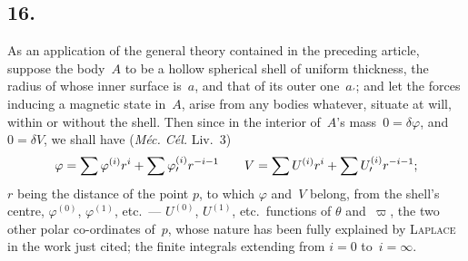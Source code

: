 \documentclass[11pt,notitlepage]{amsart}
\let\Person\textsc
\let\Title\textit
\newcommand\Section[1]{\subsection{{#1}}}
\renewcommand{\phi}{\varphi}
\begin{document}
\Section{16.}
As an application of the general theory contained in the preceding
article, suppose the body~$A$
to be a hollow spherical shell of uniform thickness,
the radius of whose inner surface is~$a$,
and that of its outer one~$a_\prime$; and let
the forces inducing a magnetic state in~$A$, arise from any bodies whatever,
situate at will, within or without the shell. Then since in the interior 
of~$A$'s
mass~${0=\delta\phi}$, and~${0=\delta V}$,
we shall have (\Title{M\'ec. C\'el.} Liv.~3)
\[
\phi=\sum\phi^{(i)}r^i+\sum\phi^{(i)}_\prime r^{-i-1}
\quad\text\quad
V=\sum U^{(i)}r^i+\sum U^{(i)}_\prime r^{-i-1};
\]
$r$ being the distance of the point $p$, to which $\phi$ and~$V$ belong,
from the
shell's centre, $\phi^{(0)}$, $\phi^{(1)}$, etc.\ --- $U^{(0)}$, $U^{(1)}$,
etc.\ functions of $\theta$ and~$\varpi$, the two
other polar co-ordinates of~$p$, whose nature has been fully explained by
\Person{Laplace} in the work just cited;
the finite integrals extending from $i=0$
to~$i=\infty$.
\end{document}
